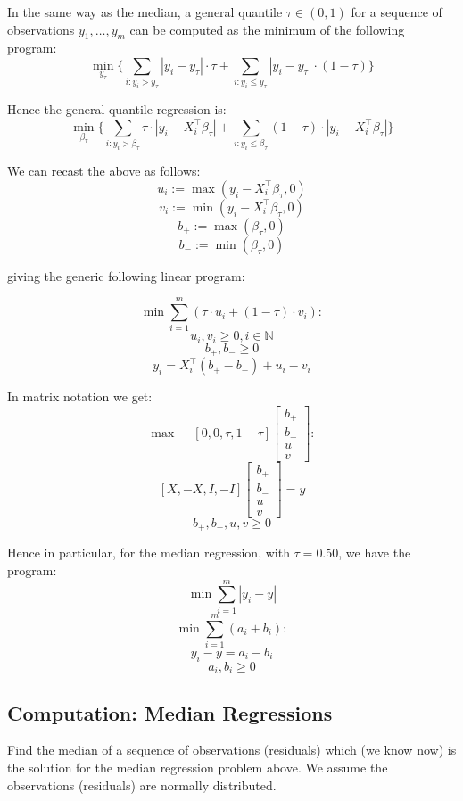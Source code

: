 \documentclass[11pt,]{article}
\begin{document}
In the same way as the median, a general quantile \(\tau\in(0,1)\) for a
sequence of observations \(y_1,\hdots,y_m\) can be computed as the
minimum of the following program:
\[\min_{y_{\tau}} \{\sum_{i:y_i>y_{\tau}}|y_i-y_{\tau}|\cdot \tau +
\sum_{i:y_i\leq y_{\tau}}|y_i-y_{\tau}|\cdot (1-\tau)
\}\]

Hence the general quantile regression is:
\[\min_{\beta_{\tau}}{} \{\sum_{i:y_i>\beta_{\tau}}\tau\cdot|y_i-X_i^{\top}\beta_{\tau}|
+ \sum_{i:y_i\leq\beta_{\tau}}(1-\tau)\cdot|y_i-X_i^{\top}\beta_{\tau}|
\}\]

We can recast the above as follows:
\[u_i := \max(y_i-X_i^{\top}\beta_{\tau}, 0)\]
\[v_i := \min(y_i-X_i^{\top}\beta_{\tau}, 0)\]
\[b_{+}:= \max(\beta_{\tau}, 0)\] \[b_{-}:= \min(\beta_{\tau}, 0)\]

giving the generic following linear program:

\[\min{}\sum_{i=1}^m (\tau\cdot u_i + (1-\tau)\cdot v_i):\]
\[u_i, v_i\geq 0, i\in\mathbb{N}\] \[b_{+}, b_{-}\geq 0\]
\[y_i = X_i^{\top}(b_{+}-b_{-})+u_i-v_i\]

In matrix notation we get: \[\max{} -[0,0,\tau,1-\tau]
\begin{bmatrix}
b_{+}\\
b_{-}\\
u\\
v
\end{bmatrix}:
\] \[[X,-X,I,-I]
\begin{bmatrix}
b_{+}\\
b_{-}\\
u\\
v
\end{bmatrix}
= y\] \[b_{+},b_{-},u,v\geq 0\]

Hence in particular, for the median regression, with \(\tau=0.50\), we
have the program: \[\min \sum_{i=1}^m|y_i-y|\]
\[\min \sum_{i=1}^m (a_i+b_i):\] \[y_i-y=a_i-b_i\] \[a_i, b_i\geq 0\]

\subsection{Computation: Median
Regressions}\label{computation-median-regressions}

Find the median of a sequence of observations (residuals) which (we know
now) is the solution for the median regression problem above. We assume
the observations (residuals) are normally distributed.
\end{document}
